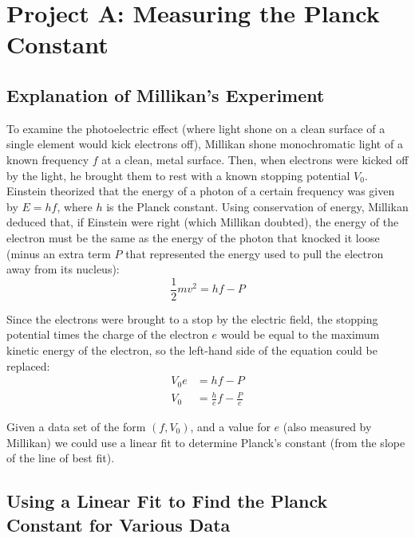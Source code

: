 \documentclass{article}
\begin{document}
\insertTitle

\section{Project A: Measuring the Planck Constant}

\subsection{Explanation of Millikan's Experiment}

To examine the photoelectric effect (where light shone on a clean surface of a single element would kick electrons off), Millikan shone monochromatic light of a known frequency $f$ at a clean, metal surface. Then, when electrons were kicked off by the light, he brought them to rest with a known stopping potential $V_0$. Einstein theorized that the energy of a photon of a certain frequency was given by $E = hf$, where $h$ is the Planck constant. Using conservation of energy, Millikan deduced that, if Einstein were right (which Millikan doubted), the energy of the electron must be the same as the energy of the photon that knocked it loose (minus an extra term $P$ that represented the energy used to pull the electron away from its nucleus):
\begin{equation}
\frac{1}{2}mv^2 = hf - P
\end{equation}

Since the electrons were brought to a stop by the electric field, the stopping potential times the charge of the electron $e$ would be equal to the maximum kinetic energy of the electron, so the left-hand side of the equation could be replaced:
\begin{equation}
\begin{aligned}
V_0e &= hf - P \\
V_0 &= \frac{h}{e}f - \frac{P}{e}
\end{aligned}
\end{equation}

Given a data set of the form $(f,V_0)$, and a value for $e$ (also measured by Millikan) we could use a linear fit to determine Planck's constant (from the slope of the line of best fit).

\subsection{Using a Linear Fit to Find the Planck Constant for Various Data}
\end{document}
